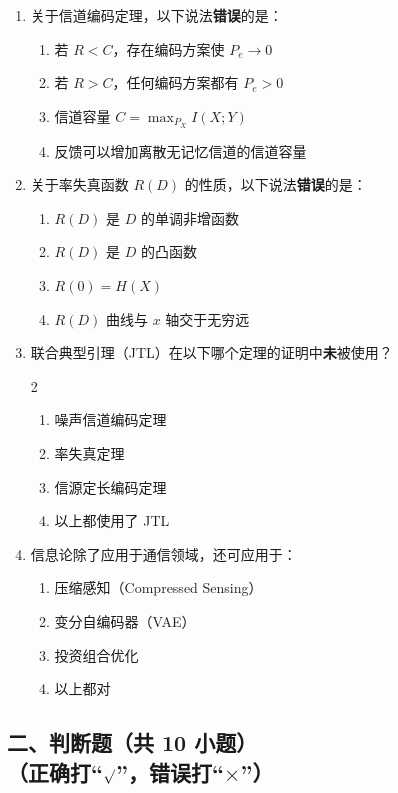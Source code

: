 \documentclass[12pt,a4paper]{ctexart}
\begin{document}
\begin{enumerate}[label=\arabic*., leftmargin=*]
\item 关于信道编码定理，以下说法\textbf{错误}的是：
\begin{enumerate}[label=(\Alph*)]
  \item 若 $R < C$，存在编码方案使 $P_e \to 0$
  \item 若 $R > C$，任何编码方案都有 $P_e > 0$
  \item 信道容量 $C = \max_{P_X} I(X;Y)$
  \item 反馈可以增加离散无记忆信道的信道容量
\end{enumerate}

\item 关于率失真函数 $R(D)$ 的性质，以下说法\textbf{错误}的是：
\begin{enumerate}[label=(\Alph*)]
  \item $R(D)$ 是 $D$ 的单调非增函数
  \item $R(D)$ 是 $D$ 的凸函数
  \item $R(0) = H(X)$
  \item $R(D)$ 曲线与 $x$ 轴交于无穷远
\end{enumerate}

\item 联合典型引理（JTL）在以下哪个定理的证明中\textbf{未}被使用？
\begin{multicols}{2}
\begin{enumerate}[label=(\Alph*)]
  \item 噪声信道编码定理
  \item 率失真定理
  \item 信源定长编码定理
  \item 以上都使用了 JTL
\end{enumerate}
\end{multicols}

\item 信息论除了应用于通信领域，还可应用于：
\begin{enumerate}[label=(\Alph*)]
  \item 压缩感知（Compressed Sensing）
  \item 变分自编码器（VAE）
  \item 投资组合优化
  \item 以上都对
\end{enumerate}

\end{enumerate}

\subsection*{二、判断题（共 10 小题）\\
（正确打``$\surd$''，错误打``$\times$''）}
\end{document}
